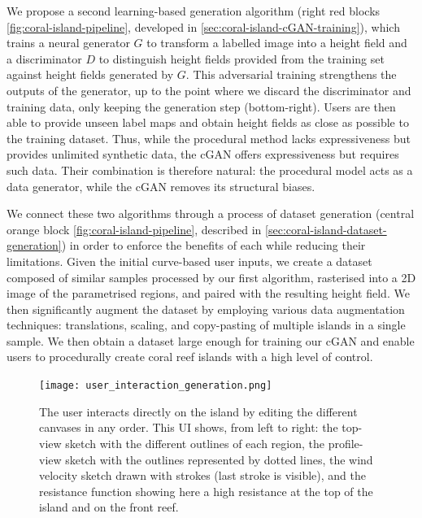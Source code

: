 We propose a second learning-based generation algorithm (right red blocks \cref{fig:coral-island-pipeline}, developed in \cref{sec:coral-island-cGAN-training}), which trains a neural generator $G$ to transform a labelled image into a height field and a discriminator $D$ to distinguish height fields provided from the training set against height fields generated by $G$. This adversarial training strengthens the outputs of the generator, up to the point where we discard the discriminator and training data, only keeping the generation step (bottom-right). Users are then able to provide unseen label maps and obtain height fields as close as possible to the training dataset. Thus, while the procedural method lacks expressiveness but provides unlimited synthetic data, the cGAN offers expressiveness but requires such data. Their combination is therefore natural: the procedural model acts as a data generator, while the cGAN removes its structural biases.

We connect these two algorithms through a process of dataset generation (central orange block \cref{fig:coral-island-pipeline}, described in \cref{sec:coral-island-dataset-generation}) in order to enforce the benefits of each while reducing their limitations. Given the initial curve-based user inputs, we create a dataset composed of similar samples processed by our first algorithm, rasterised into a 2D image of the parametrised regions, and paired with the resulting height field. We then significantly augment the dataset by employing various data augmentation techniques: translations, scaling, and copy-pasting of multiple islands in a single sample. We then obtain a dataset large enough for training our cGAN and enable users to procedurally create coral reef islands with a high level of control.

\begin{figure}
    \texttt{[image: user\_interaction\_generation.png]}
    \caption[User interface in the curve-based island generation method]{The user interacts directly on the island by editing the different canvases in any order. This UI shows, from left to right: the top-view sketch with the different outlines of each region, the profile-view sketch with the outlines represented by dotted lines, the wind velocity sketch drawn with strokes (last stroke is visible), and the resistance function showing here a high resistance at the top of the island and on the front reef.}
    \label{fig:coral-island-wind-from-strokes-interaction}
\end{figure}


